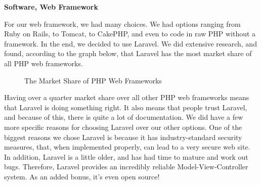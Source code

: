 \documentclass{report}
\begin{document}
\begin{center}
	\textbf{Software, Web Framework}
\end{center}
\indent
\indent
For our web framework, we had many choices. We had options ranging from Ruby on Rails, to Tomcat, to CakePHP, and even to code in raw PHP without a framework. In the end, we decided to use Laravel. We did extensive research, and found, according to the graph below, that Laravel has the most market share of all PHP web frameworks.
\begin{figure}[H]
	\caption{The Market Share of PHP Web Frameworks}
\end{figure}
\indent
Having over a quarter market share over all other PHP web frameworks means that Laravel is doing something right. It also means that people trust Laravel, and because of this, there is quite a lot of documentation.
\newline
\indent
We did have a few more specific reasons for choosing Laravel over our other options. One of the biggest reasons we chose Laravel is because it has industry-standard security measures, that, when implemented properly, can lead to a very secure web site. In addition, Laravel is a little older, and has had time to mature and work out bugs. Therefore, Laravel provides an incredibly reliable Model-View-Controller system. As an added bonus, it's even open source!
\newpage
\end{document}
